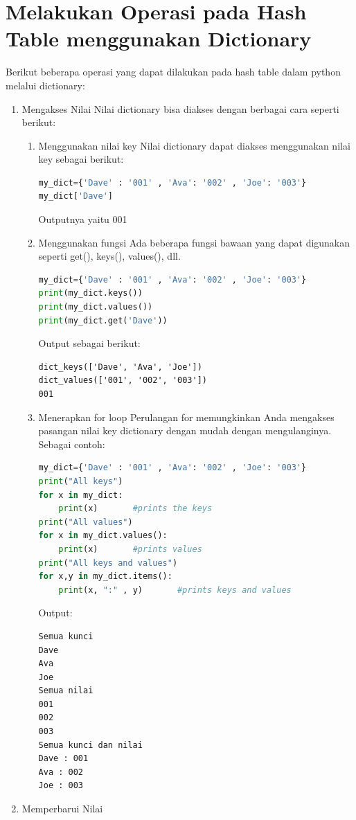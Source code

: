 \section{Melakukan Operasi pada Hash Table menggunakan Dictionary}
Berikut beberapa operasi yang dapat dilakukan pada hash table dalam python melalui dictionary:
\begin{enumerate}
\item Mengakses Nilai
Nilai dictionary bisa diakses dengan berbagai cara seperti berikut:
\begin{enumerate}
\item Menggunakan nilai key
Nilai dictionary dapat diakses menggunakan nilai key sebagai berikut:
\begin{lstlisting}[language=Python, caption=Dict dengan nilai key]
my_dict={'Dave' : '001' , 'Ava': '002' , 'Joe': '003'}
my_dict['Dave']
\end{lstlisting}
Outputnya yaitu 001
\item Menggunakan fungsi
Ada beberapa fungsi bawaan yang dapat digunakan seperti get(), keys(), values(), dll.
\begin{lstlisting}[language=Python, caption=Dict with function]
my_dict={'Dave' : '001' , 'Ava': '002' , 'Joe': '003'}
print(my_dict.keys())
print(my_dict.values())
print(my_dict.get('Dave'))
\end{lstlisting}
Output sebagai berikut:
\begin{lstlisting}
dict_keys(['Dave', 'Ava', 'Joe'])
dict_values(['001', '002', '003'])
001
\end{lstlisting}
\item Menerapkan for loop
Perulangan for memungkinkan Anda mengakses pasangan nilai key dictionary dengan mudah dengan mengulanginya. Sebagai contoh:
\begin{lstlisting}[language=Python, caption=Dict For Loop]
my_dict={'Dave' : '001' , 'Ava': '002' , 'Joe': '003'}
print("All keys")
for x in my_dict:
    print(x)       #prints the keys
print("All values")
for x in my_dict.values():
    print(x)       #prints values
print("All keys and values")
for x,y in my_dict.items():
    print(x, ":" , y)       #prints keys and values
\end{lstlisting}
Output:
\begin{lstlisting}
Semua kunci
Dave
Ava
Joe
Semua nilai
001
002
003
Semua kunci dan nilai
Dave : 001
Ava : 002
Joe : 003
\end{lstlisting}
\end{enumerate}
\item Memperbarui Nilai

\end{enumerate}
